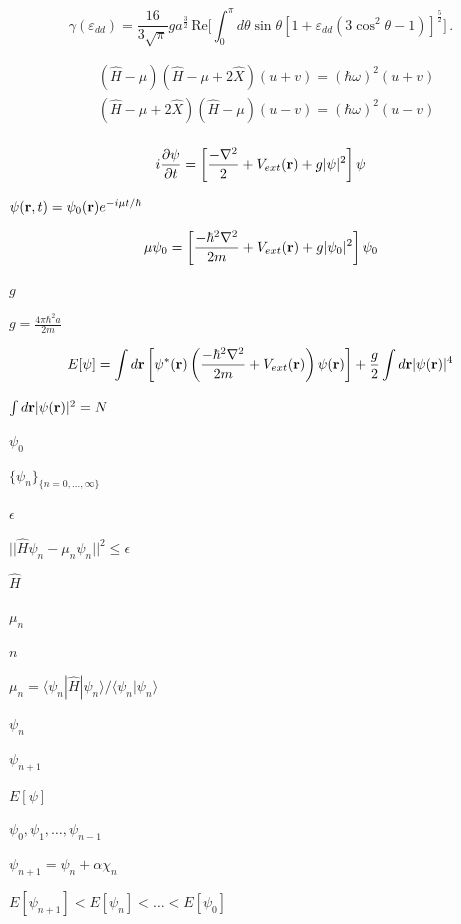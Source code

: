 \documentclass{article}
\begin{document}
\[
\gamma(\varepsilon_{dd})=\frac{16}{3\sqrt{\pi}} ga^{\frac{3}{2}}\,\mbox{Re}\bigg[\!\int_0^{\pi}
\!\!\!\!d\theta\sin\theta [1+\varepsilon_{dd}(3\cos^2\theta-1)]^{\frac{5}{2}}\bigg]\,.
\]
\pagebreak

\[
 \begin{align}
     & (\hat{H}-\mu)(\hat{H}-\mu+2\hat{X}) (u+v) = (\hbar\omega)^2 (u+v) \nonumber \\
     & (\hat{H}-\mu+2\hat{X})(\hat{H}-\mu) (u-v) = (\hbar\omega)^2 (u-v) \nonumber \\
 \end{align}
\]
\pagebreak

\[
i \frac{\partial \psi}{\partial t} = \left[ \frac{-\nabla^2}{2}+V_{ext}({\bf r})+g|\psi|^2 \right]\psi
\]
\pagebreak

$ \psi({\bf r},t)=\psi_0({\bf r})e^{-i\mu t/\hbar} $
\pagebreak

\[
\mu \psi_0 = \left[ \frac{-\hbar^2\nabla^2}{2m}+V_{ext}({\bf r})+ g|\psi_0|^2 \right]\psi_0
\]
\pagebreak

$ g $
\pagebreak

$ g=\frac{4\pi\hbar^2 a}{2m} $
\pagebreak

\[
E[\psi] = \int d{\bf r} \left[ \psi^*({\bf r})\left(\frac{-\hbar^2\nabla^2}{2m}+
V_{ext}({\bf r})\right)\psi({\bf r}) \right] +\frac{g}{2}\int d{\bf r} |\psi({\bf r})|^4
\]
\pagebreak

$ \int d{\bf r}|\psi({\bf r})|^2=N $
\pagebreak

$\psi_0$
\pagebreak

$ \{\psi_n\}_{\{n=0,...,\infty\}} $
\pagebreak

$\epsilon$
\pagebreak

$ || \hat{H}\psi_n − \mu_n \psi_n ||^2 \leq \epsilon $
\pagebreak

$\hat{H}$
\pagebreak

$ \mu_n $
\pagebreak

$ n $
\pagebreak

$ \mu_n = \langle \psi_n | \hat{H} | \psi_n \rangle /  \langle \psi_n | \psi_n \rangle $
\pagebreak

$ \psi_n $
\pagebreak

$ \psi_{n+1} $
\pagebreak

$ E[\psi] $
\pagebreak

$ \psi_0, \psi_1, \dots, \psi_{n-1} $
\pagebreak

$ \psi_{n+1} = \psi_n + \alpha \chi_n $
\pagebreak

$ E[\psi_{n+1}]
< E[\psi_n] < \dots < E[ \psi_0 ] $
\pagebreak
\end{document}
